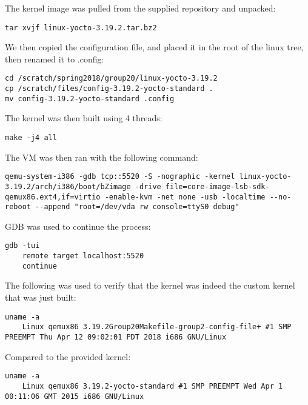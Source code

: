 \documentclass[onecolumn, draftclsnofoot,10pt, compsoc]{IEEEtran}
\begin{document}
The kernel image was pulled from the supplied repository and unpacked:
\begin{lstlisting}
tar xvjf linux-yocto-3.19.2.tar.bz2
\end{lstlisting}

We then copied the configuration file, and placed it in the root of the linux tree, then renamed it to .config:
\begin{lstlisting}
cd /scratch/spring2018/group20/linux-yocto-3.19.2
cp /scratch/files/config-3.19.2-yocto-standard .
mv config-3.19.2-yocto-standard .config
\end{lstlisting}

The kernel was then built using 4 threads:
\begin{lstlisting}
make -j4 all
\end{lstlisting}

The VM was then ran with the following command:
\begin{lstlisting}
qemu-system-i386 -gdb tcp::5520 -S -nographic -kernel linux-yocto-3.19.2/arch/i386/boot/bZimage -drive file=core-image-lsb-sdk-qemux86.ext4,if=virtio -enable-kvm -net none -usb -localtime --no-reboot --append "root=/dev/vda rw console=ttyS0 debug"
\end{lstlisting}

GDB was used to continue the process:
\begin{lstlisting}
gdb -tui
    remote target localhost:5520
    continue
\end{lstlisting}

The following was used to verify that the kernel was indeed the custom kernel that was just built:
\begin{lstlisting}
uname -a
    Linux qemux86 3.19.2Group20Makefile-group2-config-file+ #1 SMP PREEMPT Thu Apr 12 09:02:01 PDT 2018 i686 GNU/Linux
\end{lstlisting}
Compared to the provided kernel:
\begin{lstlisting}
uname -a
    Linux qemux86 3.19.2-yocto-standard #1 SMP PREEMPT Wed Apr 1 00:11:06 GMT 2015 i686 GNU/Linux
\end{lstlisting}

\newpage
\end{document}
